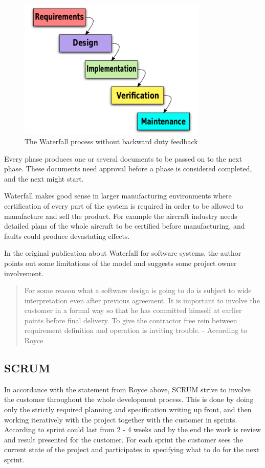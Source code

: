 \documentclass[11pt]{book}
\begin{document}
\begin{figure}[H]
      \centering
      \includegraphics[width=0.8\textwidth]{Figures/Prestudy/Waterfall.png}
      \caption{The Waterfall process \cite{wikipedia:waterfall} without backward duty feedback}
      \label{fig:pre_waterfall}
\end{figure}

Every phase produces one or several documents to be passed on to the next phase. These documents need approval before a phase is considered completed, and the next might start.

Waterfall makes good sense in larger manufacturing environments where certification of every part of the system is required in order to be allowed to manufacture and sell the product. For example the aircraft industry needs detailed plans of the whole aircraft to be certified before manufacturing, and faults could produce devastating effects.

In the original publication about Waterfall for software systems, the author points out some limitations of the model and suggests some project owner involvement.

\begin{quotation}\noindent
For some reason what a software design is going to do is subject to wide interpretation even after previous agreement. It is important to involve the customer in a formal way so that he has committed himself at earlier points before final delivery. To give the contractor free rein between requirement definition and operation is inviting trouble. - According to Royce \cite[p. 335]{DBLP:conf/icse/Royce87}
\end{quotation}

\subsection{SCRUM}
In accordance with the statement from Royce above, SCRUM strive to involve the customer throughout the whole development process. This is done by doing only the strictly required planning and specification writing up front, and then working iteratively with the project together with the customer in sprints. According to \cite[p. 73]{Sommerville10} sprint could last from 2 - 4 weeks and by the end the work is review and result presented for the customer. For each sprint the customer sees the current state of the project and participates in specifying what to do for the next sprint.
\end{document}
